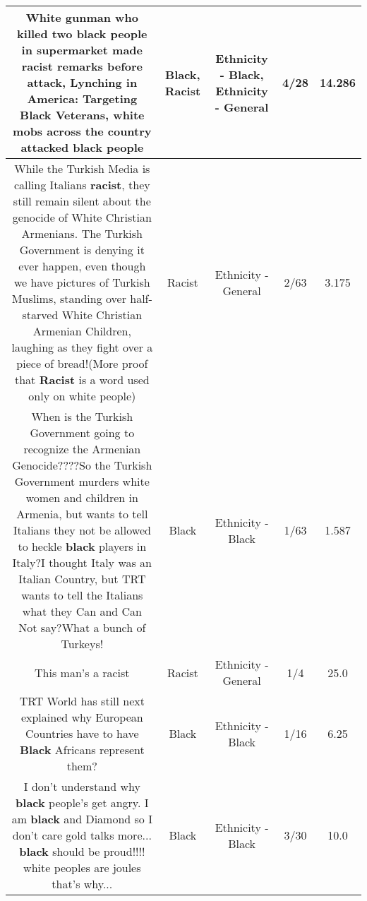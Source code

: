\documentclass[11pt]{article}
\newlength\mylength
\begin{document}
\begin{center}
\begin{longtable}{|C{.65\mylength}|C{.30\mylength}|C{.12\mylength}|C{.12\mylength}|C{.12\mylength}|}
  \small White gunman who killed two \textbf{black} people in supermarket made \textbf{racist} remarks before attack, Lynching in America: Targeting \textbf{Black} Veterans, white mobs across the country attacked \textbf{black} people\normalsize   & Black, Racist & Ethnicity - Black, Ethnicity - General & 4/28 & 14.286 \\  \hline
  \small While the Turkish Media is calling Italians \textbf{racist},   they still remain silent about the genocide of White Christian Armenians.    The Turkish Government is denying it ever happen,  even though we have pictures of Turkish Muslims,  standing  over half-starved White Christian Armenian Children,  laughing as they fight over a piece of bread!(More proof that \textbf{Racist} is a word used only on white people)\normalsize   & Racist & Ethnicity - General & 2/63 & 3.175 \\  \hline
  \small When is the Turkish Government going to recognize the Armenian Genocide????So the Turkish Government murders white women and children in Armenia,   but wants to tell Italians they not be allowed to heckle \textbf{black} players in Italy?I thought Italy was an Italian Country,  but TRT wants to tell the Italians what they Can and Can Not say?What a bunch of Turkeys!\normalsize   & Black & Ethnicity - Black & 1/63 & 1.587 \\  \hline
  \small This man's a racist\normalsize   & Racist & Ethnicity - General & 1/4 & 25.0 \\  \hline
  \small TRT World has still next explained why European Countries have to have \textbf{Black} Africans represent them?\normalsize   & Black & Ethnicity - Black & 1/16 & 6.25 \\  \hline
  \small I don't understand why  \textbf{black} people's get angry. I am \textbf{black} and Diamond so I don't care gold talks more... \textbf{black} should be proud!!!! white peoples are joules that's why...\normalsize   & Black & Ethnicity - Black & 3/30 & 10.0 \\  \hline

\end{longtable}
\end{center}
\end{document}
